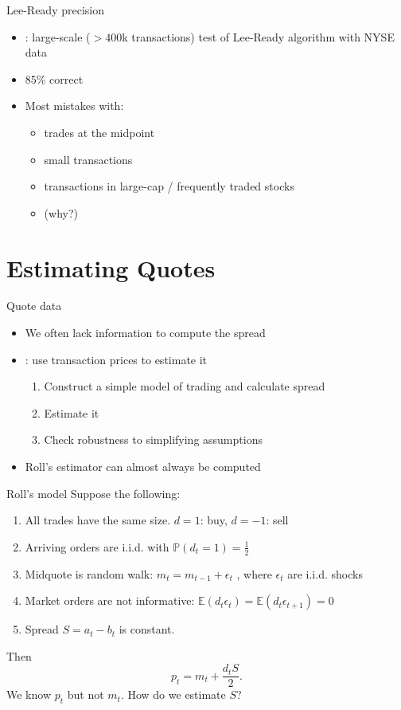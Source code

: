 \documentclass[english,10pt
,aspectratio=169
]{beamer}
\begin{document}
\begin{frame}{Lee-Ready precision}
	\begin{itemize}
		\item \citet{odders-white_occurrence_2000}: large-scale ($>400$k transactions) test of Lee-Ready algorithm with NYSE data
		\item 85\% correct
		\item Most mistakes with:
		\begin{itemize}
			\item trades at the midpoint
			\item small transactions
			\item transactions in large-cap / frequently traded stocks
			\item (why?)
		\end{itemize}
	\end{itemize}
\end{frame}



\section{Estimating Quotes}


\begin{frame}{Quote data}
	\begin{itemize}
		\item We often lack information to compute the spread
		\item \citet{roll_simple_1984}: use transaction prices to estimate it
		\begin{enumerate}
			\item Construct a simple model of trading and calculate spread
			\item Estimate it
			\item Check robustness to simplifying assumptions
		\end{enumerate}
		\item Roll's estimator can almost always be computed
	\end{itemize}
\end{frame}


\begin{frame}{Roll's model}
	Suppose the following:
	\begin{enumerate}
		\item All trades have the same size. $d=1$: buy, $d=-1$: sell
		\item Arriving orders are i.i.d. with $\mathbb{P}(d_t =1)=\frac{1}{2}$
		\item Midquote is random walk: $m_t = m_{t-1} + \epsilon_t$  , where $\epsilon_t$ are i.i.d. shocks
		\item Market orders are not informative: $\mathbb{E}(d_t \epsilon_t)=\mathbb{E}(d_t \epsilon_{t+1})=0$
		\item Spread $S = a_t-b_t$ is constant.
	\end{enumerate}
	Then
	\[
	p_t = m_t + \frac{d_t S}{2}.
	\]
	We know $p_t$ but not $m_t$. How do we estimate $S$?
\end{frame}
\end{document}
